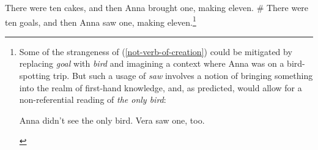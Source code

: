 \begin{exe}
	\ex \label{verb-of-creation} There were ten cakes, and then Anna brought one, making eleven.
	\ex \label{not-verb-of-creation} \# There were ten goals, and then Anna saw one, making eleven.\footnote{Some of the strangeness of (\ref{not-verb-of-creation}) could be mitigated by replacing \textit{goal} with \textit{bird} and imagining a context where Anna was on a bird-spotting trip. But such a usage of \textit{saw} involves a notion of bringing something into the realm of first-hand knowledge, and, as predicted, would allow for a non-referential reading of \textit{the only bird}: \begin{exe} \ex Anna didn't see the only bird. Vera saw one, too. \end{exe} }
\end{exe}